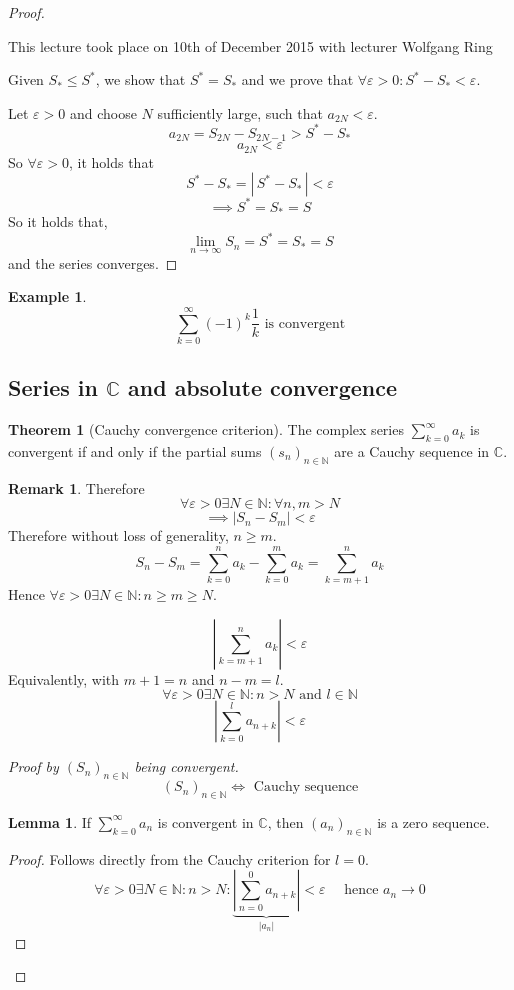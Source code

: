 \documentclass[a4paper,landscape,twocolumn]{article}
\theoremstyle{definition}
\newtheorem{theorem}{Theorem}
\newtheorem{rem}{Remark}
\newtheorem{ex}{Example}
\newtheorem{lemma}{Lemma}
\newcommand\abs[1]{\left|#1\right|}
\newcommand\seq[1]{{\left(#1\right)}_{n \in \mathbb N}}
\newcommand\card[1]{\left|\,#1\,\right|}
\newcommand\meta[3]{\begin{mdframed}[skipbelow=4pt,skipabove=4pt,innermargin=1pt,innerleftmargin=1pt,innerrightmargin=1pt]\begin{center}\small{\textdownarrow{} This #1 took place on #2 with lecturer #3}\end{center}\end{mdframed}}
\begin{document}
\begin{proof}
  \meta{lecture}{10th of December 2015}{Wolfgang Ring}

  Given $S_* \leq S^*$, we show that $S^* = S_*$ and we prove that $\forall \varepsilon > 0: S^* - S_* < \varepsilon$.

  Let $\varepsilon > 0$ and choose $N$ sufficiently large, such that $a_{2N} < \varepsilon$.
  \[ a_{2N} = S_{2N} - S_{2N-1} > S^* - S_* \]
  \[ a_{2N} < \varepsilon \]
  So $\forall \varepsilon > 0$, it holds that
  \[ S^* - S_* = \card{S^* - S_*} < \varepsilon \]
  \[ \implies S^* = S_* = S \]
  So it holds that,
  \[ \lim_{n\to\infty} S_n = S^* = S_* = S \]
  and the series converges.
\end{proof}

\begin{ex}
  \[ \sum_{k=0}^\infty (-1)^{k} \frac{1}{k} \text{ is convergent} \]
\end{ex}

\subsection{Series in $\mathbb C$ and absolute convergence}
%
\begin{theorem}[Cauchy convergence criterion]
  The complex series $\sum_{k=0}^{\infty} a_k$ is convergent if and only if
  the partial sums $\seq{s_n}$ are a Cauchy sequence in $\mathbb C$.
\end{theorem}
\begin{rem}
  Therefore
  \[ \forall \varepsilon > 0 \exists N \in \mathbb N: \forall n,m > N \]
  \[ \implies \abs{S_n - S_m} < \varepsilon \]
  Therefore without loss of generality, $n \geq m$.
  \[ S_n - S_m = \sum_{k=0}^n a_k - \sum_{k=0}^m a_k = \sum_{k=m+1}^n a_k \]
  Hence $\forall \varepsilon > 0 \exists N \in \mathbb N: n \geq m \geq N$.

  \[ \abs{\sum_{k=m+1}^n a_k} < \varepsilon \]
  Equivalently, with $m + 1 = n$ and $n - m = l$.
  \[ \forall \varepsilon > 0 \exists N \in \mathbb N: n > N \text{ and } l \in \mathbb N \]
  \[ \abs{\sum_{k=0}^l a_{n+k}} < \varepsilon \]
\end{rem}
\begin{proof}[Proof by $\seq{S_n}$ being convergent]
  \[ \seq{S_n} \iff \text{ Cauchy sequence} \]

  \begin{lemma}
    If $\sum_{k=0}^{\infty} a_n$ is convergent in $\mathbb C$, then $\seq{a_n}$ is a zero sequence.
  \end{lemma}
  \begin{proof}
    Follows directly from the Cauchy criterion for $l = 0$.
    \[
      \forall \varepsilon > 0 \exists N \in \mathbb N: n > N:
      \underbrace{\abs{\sum_{n=0}^0 a_{n+k}}}_{\abs{a_n}} < \varepsilon
      \quad \text{ hence } a_n \to 0
    \]
  \end{proof}
\end{proof}
\end{document}
